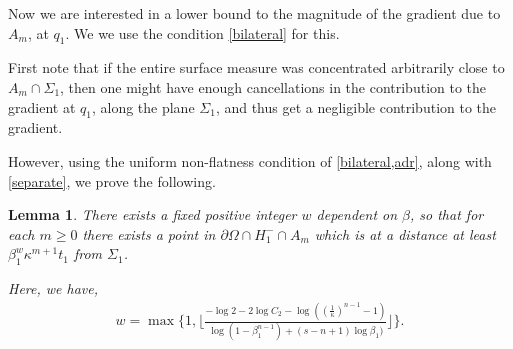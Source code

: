 \documentclass{article}
\newcounter{lem}
\theoremstyle{plain}
\theoremstyle{plain}
\newtheorem{lemma}[theorem]{Lemma}
\theoremstyle{definition}
\theoremstyle{plain}
\begin{document}
    Now we are interested in a lower bound to the magnitude of the gradient due to $A_m$, at $q_1$. We we use the condition \cref{bilateral} for this.

    First note that if the entire surface measure was concentrated arbitrarily close to $A_m \cap \Sigma_1$, then one might have enough cancellations in the contribution to the gradient at $q_1$, along the plane $\Sigma_1$, and thus get a negligible contribution to the gradient. 
    
    However, using the uniform non-flatness condition of \cref{bilateral,adr}, along with \cref{separate}, we prove the following. 
    
    \begin{lemma}\label{lemma6}
    There exists a fixed positive integer $w$ dependent on $\beta$, so that for each $m\geq 0$ there exists a point in $\partial\Omega\cap H^{-}_{1}\cap A_m$ which is at a distance at least $\beta_1^w \kappa^{m+1} t_1$ from $\Sigma_1$. 
    
    
    Here, we have,
    \begin{align}
           w=\max \{1, \Big\lfloor \frac{-\log 2 -2\log C_2 -\log((\frac{1}{\kappa})^{n-1}-1) }{\log(1-\beta_1^{n-1})+(s-n+1)\log \beta_1)}\Big\rfloor \}.
       \end{align}

 
    \end{lemma}
\end{document}
